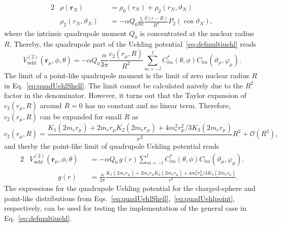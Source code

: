 \begin{alignat}{2}
&\rho(\mathbf{r}_N)&&=\rho_0(r_N) + \rho_2(r_N,\vartheta_N)\\
&\rho_2(r_N,\vartheta_N)&&=-\alpha Q_0 \frac{5}{8\pi }\frac{\delta(r-R)}{R^4}
P_2(\cos\vartheta_N),
\end{alignat}
where the intrinsic quadrupole moment $Q_0$ is concentrated at the nuclear radius $R$. Thereby, the quadrupole part of the Uehling potential~\eqref{eq:defmultiuehl} reads
\begin{equation}
V^{(2)}_{\text{uehl}}(\mathbf{r}_\mu,\phi,\theta)=
-\alpha Q_0 \frac{\alpha}{3\pi}\frac{c_2(r_\mu,R)}{R^2}\sum\limits_{m=-l}^{l} C_{lm}^*(\theta,\phi)C_{lm}(\vartheta_\mu,\varphi_\mu).
\label{eq:quadUehlShell}
\end{equation}
The limit of a point-like quadrupole moment is the limit of zero nuclear radius $R$ in Eq.~\eqref{eq:quadUehlShell}. The limit cannot be calculated naively due to the $R^{2}$ factor in the denominator. However, it turns out that the Taylor expansion of $c_2(r_\mu,R)$ around $R=0$ has no constant and no linear term. Therefore, $c_2(r_\mu,R)$ can be expanded for small $R$ as
\begin{equation}
c_2(r_\mu,R) = \frac{K_1(2m_er_\mu)+2m_er_\mu K_2(2m_er_\mu)+4m_e^2r_\mu^2/3K_3(2m_er_\mu)}{r^3}R^2 + \mathcal{O}(R^3),
\end{equation}
and therby the point-like limit of quadrupole Uehling potential reads
\begin{alignat}{2}
\label{eq:quadUehlpoint}
&V^{(2)}_{\text{uehl}}(\mathbf{r}_\mu,\phi,\theta)&&=
-\alpha Q_0\, g(r) \sum\limits_{m=-l}^{l} C_{lm}^*(\theta,\phi)C_{lm}(\vartheta_\mu,\varphi_\mu).\\
&\qquad\qquad g(r)&&=\frac{\alpha}{3\pi}\frac{K_1(2m_er_\mu)+2m_er_\mu K_2(2m_er_\mu)+4m_e^2r_\mu^2/3K_3(2m_er_\mu)}{r^3}.
\label{eq:quadUehlShellLimit}
\end{alignat}
The expressions for the quadrupole Uehling potential for the charged-sphere and point-like distributions from Eqs.~\eqref{eq:quadUehlShell},~\eqref{eq:quadUehlpoint}, respectively, can be used for testing the implementation of the general case in Eq.~\eqref{eq:defmultiuehl}.\\


